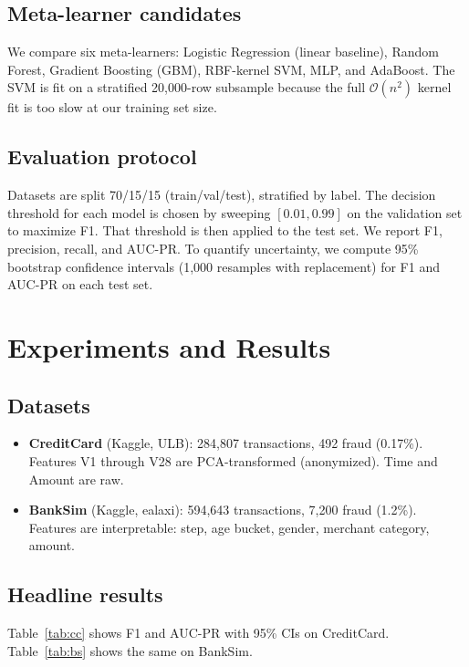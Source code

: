 \documentclass[11pt]{article}
\begin{document}
\subsection{Meta-learner candidates}
We compare six meta-learners: Logistic Regression (linear baseline), Random Forest, Gradient Boosting (GBM), RBF-kernel SVM, MLP, and AdaBoost. The SVM is fit on a stratified 20{,}000-row subsample because the full $\mathcal{O}(n^2)$ kernel fit is too slow at our training set size.

\subsection{Evaluation protocol}
Datasets are split 70/15/15 (train/val/test), stratified by label. The decision threshold for each model is chosen by sweeping $[0.01, 0.99]$ on the validation set to maximize F1. That threshold is then applied to the test set. We report F1, precision, recall, and AUC-PR. To quantify uncertainty, we compute 95\% bootstrap confidence intervals (1{,}000 resamples with replacement) for F1 and AUC-PR on each test set.

\section{Experiments and Results}

\subsection{Datasets}
\begin{itemize}
    \item \textbf{CreditCard} (Kaggle, ULB): 284,807 transactions, 492 fraud (0.17\%). Features V1 through V28 are PCA-transformed (anonymized). Time and Amount are raw.
    \item \textbf{BankSim} (Kaggle, ealaxi): 594,643 transactions, 7,200 fraud (1.2\%). Features are interpretable: step, age bucket, gender, merchant category, amount.
\end{itemize}

\subsection{Headline results}

Table~\ref{tab:cc} shows F1 and AUC-PR with 95\% CIs on CreditCard. Table~\ref{tab:bs} shows the same on BankSim.
\end{document}
